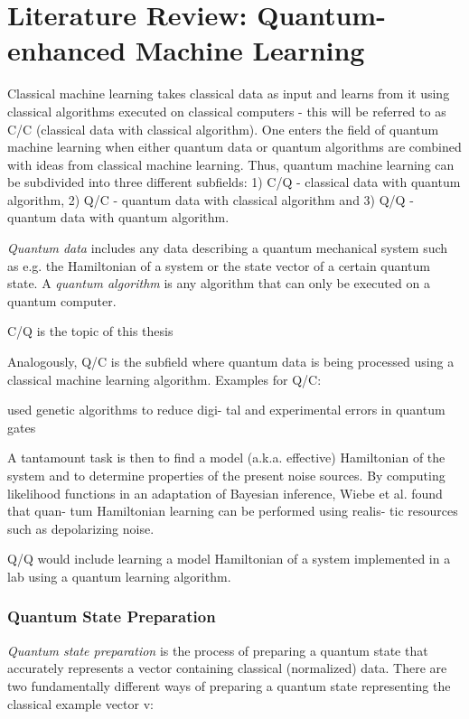 \chapter{Literature Review: Quantum-enhanced Machine Learning}\label{sec:qml}

Classical machine learning takes classical data as input and learns from it using classical algorithms executed on classical computers - this will be referred to as C/C (classical data with classical algorithm). One enters the field of quantum machine learning when either quantum data or quantum algorithms are combined with ideas from classical machine learning. Thus, quantum machine learning can be subdivided into three different subfields: 1) C/Q - classical data with quantum algorithm, 2) Q/C - quantum data with classical algorithm and 3) Q/Q - quantum data with quantum algorithm.

\emph{Quantum data} includes any data describing a quantum mechanical system such as e.g. the Hamiltonian of a system or the state vector of a certain quantum state. A \emph{quantum algorithm} is any algorithm that can only be executed on a quantum computer. 

C/Q is the topic of this thesis

Analogously, Q/C is the subfield where quantum data is being processed using a classical machine learning algorithm. Examples for Q/C:

used genetic algorithms to reduce digi-
tal and experimental errors in quantum gates

A tantamount task is then to
find a model (a.k.a. effective) Hamiltonian of the system
and to determine properties of the present noise sources.
By computing likelihood functions in an adaptation of
Bayesian inference, Wiebe et al. found that quan-
tum Hamiltonian learning can be performed using realis-
tic resources such as depolarizing noise.

Q/Q would include learning a model Hamiltonian of a system implemented in a lab using a quantum learning algorithm.

\subsection{Quantum State Preparation}
\label{subsubsec:quantumstatepreparation}

\emph{Quantum state preparation} is the process of preparing a quantum state that accurately represents a vector containing classical (normalized) data. There are two fundamentally different ways of preparing a quantum state representing the classical example vector v:

